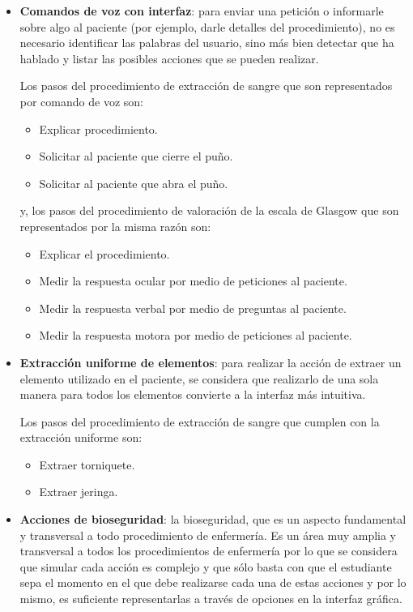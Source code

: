 \begin{itemize}

\item \textbf{Comandos de voz con interfaz}:  para enviar una petición o
    informarle sobre algo al paciente (por ejemplo, darle detalles del
    procedimiento), no es necesario identificar las palabras del usuario, sino
    más bien detectar que ha hablado y listar las posibles acciones que se
    pueden realizar.
    
    Los pasos del procedimiento de extracción de sangre que son representados por 
    comando de voz son:
    
    \begin{itemize}
        \item Explicar procedimiento.
        \item Solicitar al paciente que cierre el puño.
        \item Solicitar al paciente que abra el puño.
    \end{itemize}
    
    y, los pasos del procedimiento de valoración de la escala de Glasgow 
    que son representados por la misma razón son:
    \begin{itemize}
        \item Explicar el procedimiento.
        \item Medir la respuesta ocular por medio de peticiones al paciente.
        \item Medir la respuesta verbal por medio de preguntas al paciente.
        \item Medir la respuesta motora por medio de peticiones al paciente.
    \end{itemize}

\item \textbf{Extracción uniforme de elementos}: para realizar la acción de
    extraer un elemento utilizado en el paciente, se considera que realizarlo de
    una sola manera para todos los elementos convierte a la interfaz más
    intuitiva.

    Los pasos del procedimiento de extracción de sangre que cumplen con la extracción 
    uniforme son:
    
    \begin{itemize}
        \item Extraer torniquete.
        \item Extraer jeringa.
    \end{itemize}
    
\item 
    \textbf{Acciones de bioseguridad}: la bioseguridad, que es un aspecto
    fundamental y transversal a todo procedimiento de enfermería. Es un área muy
    amplia y transversal a todos los procedimientos de enfermería por lo que se
    considera que simular cada acción es complejo y que sólo basta con que el
    estudiante sepa el momento en el que debe realizarse cada una de estas
    acciones y por lo mismo, es suficiente representarlas a través de opciones
    en la interfaz gráfica.


\end{itemize}
